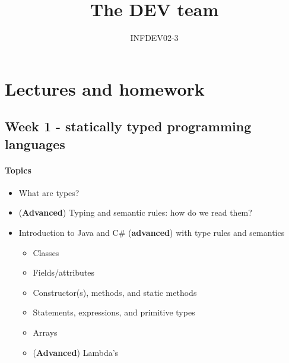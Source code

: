 \documentclass[12pt,a4paper,draft]{article}
\author{INFDEV02-3}
\title{The DEV team}
\begin{document}
	\maketitle
	
	\section{Lectures and homework}
	
		\subsection{Week 1 - statically typed programming languages}
		
		\paragraph*{Topics}
		\begin{itemize}
			\item What are types?
			\item (\textbf{Advanced}) Typing and semantic rules: how do we read them?
			\item Introduction to Java and C\# (\textbf{advanced}) with type rules and semantics
			\begin{itemize}
				\item Classes
				\item Fields/attributes
				\item Constructor(s), methods, and static methods
				\item Statements, expressions, and primitive types
				\item Arrays
				\item (\textbf{Advanced}) Lambda's
			\end{itemize}
		\end{itemize}
		
\end{document}
